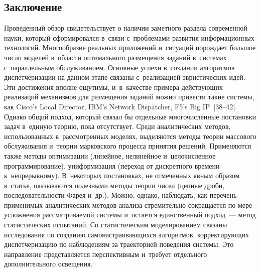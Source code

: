 \begin{multicols}{2}
\section{Заключение}

    Проведенный обзор свидетельствует о наличии заметного раздела современной науки,  
который сформировался в~связи с~проблемами развития информационных технологий. 
Многообразие реальных приложений и~ситуаций порождает большое число моделей 
в~области оптимального размещения заданий в~системах с~параллельным обслуживанием. 
Основные успехи в~создании алгоритмов диспетчеризации на данном этапе связаны 
с~реализацией эвристических идей. Эти достижения вполне ощутимы, и~в~качестве 
примера действующих реализаций механизмов для размещения заданий можно привести 
такие системы, как Cisco's Local Director, IBM's Network Dispatcher, F5's Big 
    IP~[38--42]. Однако общий подход, который 
связал бы отдельные многочисленные постановки задач в~единую теорию, пока 
отсутствует. Среди аналитических методов, использованных в~рассмотренных моделях, 
выделяются методы теории массового обслуживания и~теории марковского процесса 
принятия решений. Применяются также методы оптимизации (линейное, нелинейное 
и~целочисленное программирование), униформизация (переход от дискретного времени 
к~непрерывному). В~некоторых постановках, не отмеченных явным образом в~статье, 
оказываются полезными методы теории чисел (цепные дроби, последовательности Фарея 
и~др.). Можно, однако, наблюдать, как перечень применимых аналитических методов 
анализа стремительно сокращается по мере усложнения рассматриваемой системы 
и~остается единственный подход~--- метод статистических испытаний. Со 
статистическим моделированием связаны исследования по созданию 
самонастраивающихся алгоритмов, корректирующих диспетчеризацию по наблюдениям 
за траекторией поведения системы. Это направление представляется перспективным 
и~требует отдельного дополнительного освещения.


\end{multicols}

